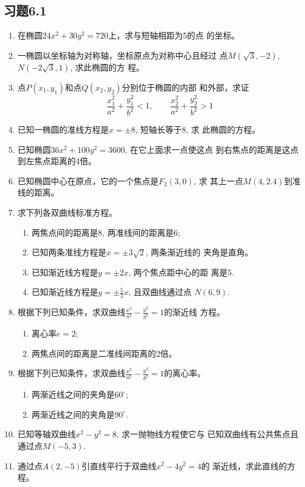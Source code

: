 \subsection*{习题6.1}
\begin{enumerate}
\item 在椭圆$24x^2+30y^2=720$上，求与短轴相距为5的点
的坐标。
\item 一椭圆以坐标轴为对称轴，坐标原点为对称中心且经过
点$M(\sqrt{3},-2)$, $N(-2\sqrt{3},1)$, 求此椭圆的方
程。
\item 点$P(x_1,y_1)$和点$Q(x_2,y_2)$分别位于椭圆的内部
和外部，求证
\[\frac{x_1^2}{a^2}+\frac{y_1^2}{b^2}<1,\qquad \frac{x_2^2}{a^2}+\frac{y_2^2}{b^2}>1\]
\item 已知一椭圆的准线方程是$x=\pm 8$, 短轴长等于8, 求
此椭圆的方程。
\item 已知椭圆$36x^2+100y^2=3600$, 在它上面求一点使这点
到右焦点的距离是这点到左焦点距离的4倍。
\item 已知椭圆中心在原点，它的一个焦点是$F_2(3,0)$, 求
其上一点$M(4,2.4)$到准线的距离。
\item 求下列各双曲线标准方程。
\begin{enumerate}
\item 两焦点间的距离是8, 两准线间的距离是6;
\item 已知两条准线方程是$x=\pm 3\sqrt{2}$, 两条渐近线的
夹角是直角。
\item 已知渐近线方程是$y=\pm 2x$, 两个焦点距中心的距
离是5.
\item 已知渐近线方程是$y=\pm \frac{5}{3}x$, 且双曲线通过点
$N(6,9)$.
\end{enumerate}

\item 根据下列已知条件，求双曲线$\frac{x^2}{a^2}-\frac{y^2}{b^2}=1$的渐近线
方程。
\begin{enumerate}
    \item 离心率$e=2$; 
    \item 两焦点间的距离是二准线间距离的2倍。
\end{enumerate}

\item 根据下列已知条件，求双曲线$\frac{x^2}{a^2}-\frac{y^2}{b^2}=1$的离心率。
\begin{enumerate}
    \item 两渐近线之间的夹角是$60^{\circ}$;
    \item 两渐近线之间的夹角是$90^{\circ}$.
\end{enumerate}

\item 已知等轴双曲线$x^2-y^2=8$, 求一抛物线方程使它与
已知双曲线有公共焦点且通过点$M(-5,3)$.
\item 通过点$A(2,-5)$引直线平行于双曲线$x^2-4y^2=4$的
渐近线，求此直线的方程。


\end{enumerate}
